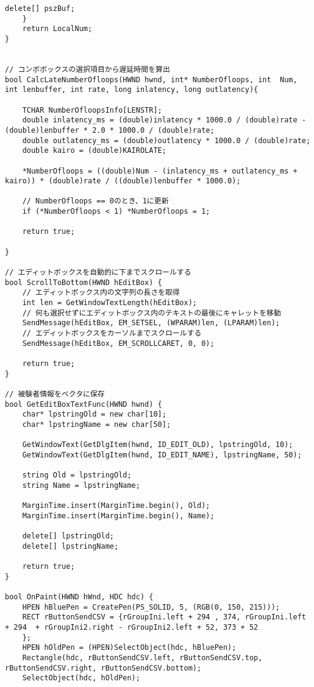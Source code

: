 \begin{lstlisting}[caption=main.cpp]
		delete[] pszBuf;
	}
	return LocalNum;
}


// コンボボックスの選択項目から遅延時間を算出
bool CalcLateNumberOfloops(HWND hwnd, int* NumberOfloops, int  Num, int lenbuffer, int rate, long inlatency, long outlatency){
	
	TCHAR NumberOfloopsInfo[LENSTR];
	double inlatency_ms = (double)inlatency * 1000.0 / (double)rate - (double)lenbuffer * 2.0 * 1000.0 / (double)rate;
	double outlatency_ms = (double)outlatency * 1000.0 / (double)rate;
	double kairo = (double)KAIROLATE;

	*NumberOfloops = ((double)Num - (inlatency_ms + outlatency_ms + kairo)) * (double)rate / ((double)lenbuffer * 1000.0);

	// NumberOfloops == 0のとき、1に更新
	if (*NumberOfloops < 1) *NumberOfloops = 1;

	return true;

}

// エディットボックスを自動的に下までスクロールする
bool ScrollToBottom(HWND hEditBox) {
	// エディットボックス内の文字列の長さを取得
	int len = GetWindowTextLength(hEditBox);
	// 何も選択せずにエディットボックス内のテキストの最後にキャレットを移動
	SendMessage(hEditBox, EM_SETSEL, (WPARAM)len, (LPARAM)len);
	// エディットボックスをカーソルまでスクロールする
	SendMessage(hEditBox, EM_SCROLLCARET, 0, 0);

	return true;
}

// 被験者情報をベクタに保存
bool GetEditBoxTextFunc(HWND hwnd) {
	char* lpstringOld = new char[10];
	char* lpstringName = new char[50];

	GetWindowText(GetDlgItem(hwnd, ID_EDIT_OLD), lpstringOld, 10);
	GetWindowText(GetDlgItem(hwnd, ID_EDIT_NAME), lpstringName, 50);

	string Old = lpstringOld;
	string Name = lpstringName;

	MarginTime.insert(MarginTime.begin(), Old);
	MarginTime.insert(MarginTime.begin(), Name);

	delete[] lpstringOld;
	delete[] lpstringName;

	return true;
}

bool OnPaint(HWND hWnd, HDC hdc) {
	HPEN hBluePen = CreatePen(PS_SOLID, 5, (RGB(0, 150, 215)));
	RECT rButtonSendCSV = {rGroupIni.left + 294 , 374, rGroupIni.left + 294  + rGroupIni2.right - rGroupIni2.left + 52, 373 + 52
	};
	HPEN hOldPen = (HPEN)SelectObject(hdc, hBluePen);
	Rectangle(hdc, rButtonSendCSV.left, rButtonSendCSV.top, rButtonSendCSV.right, rButtonSendCSV.bottom);
	SelectObject(hdc, hOldPen);


\end{lstlisting}
